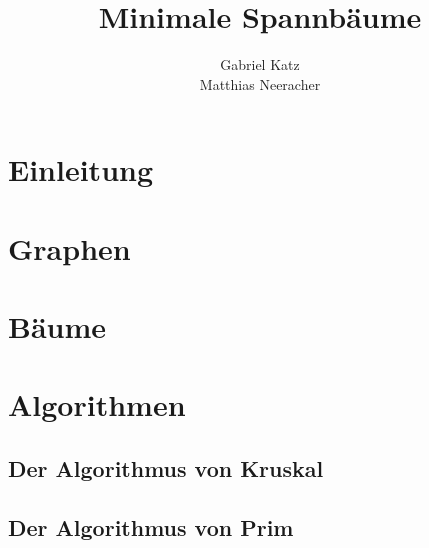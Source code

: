 \documentclass[12pt]{report}
\title{Minimale Spannb\"{a}ume}
\author{Gabriel Katz\\ Matthias Neeracher}
\begin{document}
\maketitle
\tableofcontents
\chapter{Einleitung}
\chapter{Graphen}
\chapter{B\"{a}ume}
\chapter{Algorithmen}
\section{Der Algorithmus von Kruskal}
\section{Der Algorithmus von Prim}
\end{document}
